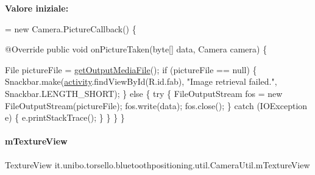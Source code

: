{\bfseries Valore iniziale\+:}
\begin{DoxyCode}
= \textcolor{keyword}{new} Camera.PictureCallback() \{

        @Override
        \textcolor{keyword}{public} \textcolor{keywordtype}{void} onPictureTaken(byte[] data, Camera camera) \{

            File pictureFile = \hyperlink{classit_1_1unibo_1_1torsello_1_1bluetoothpositioning_1_1util_1_1CameraUtil_acef4209a5ff8034ddd3adab34761fe98_acef4209a5ff8034ddd3adab34761fe98}{getOutputMediaFile}();
            \textcolor{keywordflow}{if} (pictureFile == null) \{
                Snackbar.make(\hyperlink{classit_1_1unibo_1_1torsello_1_1bluetoothpositioning_1_1util_1_1CameraUtil_a06e6b6842aa57e9e9db83a88b4aa3f25_a06e6b6842aa57e9e9db83a88b4aa3f25}{activity}.findViewById(R.id.fab),
                        \textcolor{stringliteral}{"Image retrieval failed."}, Snackbar.LENGTH\_SHORT);
            \} \textcolor{keywordflow}{else} \{
                \textcolor{keywordflow}{try} \{
                    FileOutputStream fos = \textcolor{keyword}{new} FileOutputStream(pictureFile);
                    fos.write(data);
                    fos.close();
                \} \textcolor{keywordflow}{catch} (IOException e) \{
                    e.printStackTrace();
                \}
            \}
        \}
    \}
\end{DoxyCode}
\hypertarget{classit_1_1unibo_1_1torsello_1_1bluetoothpositioning_1_1util_1_1CameraUtil_a4fb9e02d00c0a61cb6b8992e085cf374_a4fb9e02d00c0a61cb6b8992e085cf374}{}\label{classit_1_1unibo_1_1torsello_1_1bluetoothpositioning_1_1util_1_1CameraUtil_a4fb9e02d00c0a61cb6b8992e085cf374_a4fb9e02d00c0a61cb6b8992e085cf374} 
\paragraph{\texorpdfstring{m\+Texture\+View}{mTextureView}}
{\footnotesize\ttfamily Texture\+View it.\+unibo.\+torsello.\+bluetoothpositioning.\+util.\+Camera\+Util.\+m\+Texture\+View\hspace{0.3cm}{\ttfamily [private]}}

\hypertarget{classit_1_1unibo_1_1torsello_1_1bluetoothpositioning_1_1util_1_1CameraUtil_a49f1624f6df81b6a7604b5928c17d443_a49f1624f6df81b6a7604b5928c17d443}{}\label{classit_1_1unibo_1_1torsello_1_1bluetoothpositioning_1_1util_1_1CameraUtil_a49f1624f6df81b6a7604b5928c17d443_a49f1624f6df81b6a7604b5928c17d443} 
